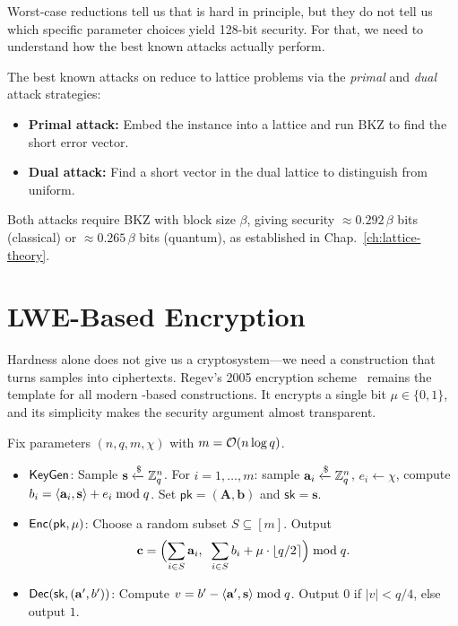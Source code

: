 Worst-case reductions tell us that \lwe{} is hard in principle, but they do not tell us which specific parameter choices yield 128-bit security.  For that, we need to understand how the best known attacks actually perform.

The best known attacks on \lwe{} reduce to lattice problems via the \emph{primal} and \emph{dual} attack strategies:

\begin{itemize}
\item \textbf{Primal attack:} Embed the \lwe{} instance into a lattice and run BKZ to find the short error vector.
\item \textbf{Dual attack:} Find a short vector in the dual lattice to distinguish \lwe{} from uniform.
\end{itemize}

Both attacks require BKZ with block size $\beta$, giving security $\approx 0.292\,\beta$ bits (classical) or $\approx 0.265\,\beta$ bits (quantum), as established in Chap.~\ref{ch:lattice-theory}.


\section{LWE-Based Encryption}
\label{sec:lwe-encryption}

Hardness alone does not give us a cryptosystem---we need a construction that turns \lwe{} samples into ciphertexts.  Regev's 2005 encryption scheme~\cite{Regev2009} remains the template for all modern \lwe{}-based constructions.  It encrypts a single bit $\mu \in \{0,1\}$, and its simplicity makes the security argument almost transparent.

\begin{definition}
\label{def:regev-encryption}
Fix parameters $(n, q, m, \chi)$ with $m = \mathcal{O}(n\log q)$.
\begin{itemize}
\item $\mathsf{KeyGen}$: Sample $\mathbf{s}\getsr\Zq^n$.  For $i=1,\ldots,m$: sample $\mathbf{a}_i\getsr\Zq^n$, $e_i\leftarrow\chi$, compute $b_i = \left\langle \mathbf{a}_i, \mathbf{s} \right\rangle + e_i \bmod q$.  Set $\mathsf{pk} = (\mathbf{A}, \mathbf{b})$ and $\mathsf{sk} = \mathbf{s}$.
\item $\mathsf{Enc}(\mathsf{pk}, \mu)$: Choose a random subset $S\subseteq[m]$.  Output
\begin{equation}
\mathbf{c} = \Bigl(\sum_{i\in S}\mathbf{a}_i,\;\;\sum_{i\in S}b_i + \mu\cdot\lfloor q/2\rceil\Bigr) \bmod q.
\end{equation}
\item $\mathsf{Dec}(\mathsf{sk}, (\mathbf{a}', b'))$: Compute $v = b' - \left\langle \mathbf{a}', \mathbf{s} \right\rangle \bmod q$.  Output $0$ if $|v| < q/4$, else output $1$.
\end{itemize}
\end{definition}

